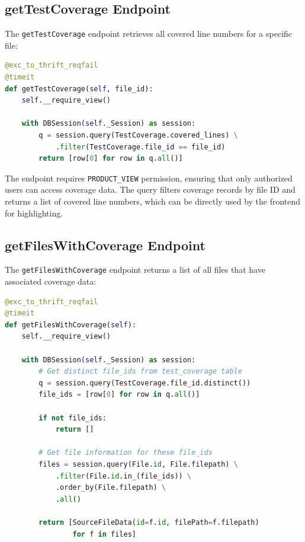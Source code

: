 \subsection{getTestCoverage Endpoint}

The \texttt{getTestCoverage} endpoint retrieves all covered line numbers for a specific file:

\begin{lstlisting}[language=Python, caption={getTestCoverage API implementation}]
@exc_to_thrift_reqfail
@timeit
def getTestCoverage(self, file_id):
    self.__require_view()
    
    with DBSession(self._Session) as session:
        q = session.query(TestCoverage.covered_lines) \
            .filter(TestCoverage.file_id == file_id)
        return [row[0] for row in q.all()]
\end{lstlisting}

The endpoint requires \texttt{PRODUCT\_VIEW} permission, ensuring that only authorized users can access coverage data. The query filters coverage records by file ID and returns a list of covered line numbers, which can be directly used by the frontend for highlighting.

\subsection{getFilesWithCoverage Endpoint}

The \texttt{getFilesWithCoverage} endpoint returns a list of all files that have associated coverage data:

\begin{lstlisting}[language=Python, caption={getFilesWithCoverage API implementation}]
@exc_to_thrift_reqfail
@timeit
def getFilesWithCoverage(self):
    self.__require_view()
    
    with DBSession(self._Session) as session:
        # Get distinct file_ids from test_coverage table
        q = session.query(TestCoverage.file_id.distinct())
        file_ids = [row[0] for row in q.all()]
        
        if not file_ids:
            return []
        
        # Get file information for these file_ids
        files = session.query(File.id, File.filepath) \
            .filter(File.id.in_(file_ids)) \
            .order_by(File.filepath) \
            .all()
        
        return [SourceFileData(id=f.id, filePath=f.filepath) 
                for f in files]
\end{lstlisting}

